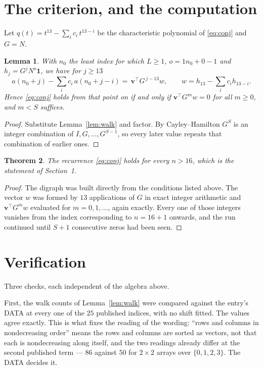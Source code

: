\documentclass[11pt,a4paper]{article}
\theoremstyle{plain}
\newtheorem{theorem}{Theorem}
\newtheorem{lemma}[theorem]{Lemma}
\theoremstyle{definition}
\begin{document}
\section{The criterion, and the computation}

Let $q(t)=t^{13}-\sum_i c_i\,t^{13-i}$ be the characteristic polynomial of
\eqref{eq:conj} and $G=N$.

\begin{lemma}\label{lem:crit}
With $n_0$ the least index for which $L\ge1$, $o=1n_0+0-1$ and
$h_j=G^{j}N^{o}\mathbf{1}$, we have for $j\ge13$
\[
a(n_0+j)-\sum_i c_i\,a(n_0+j-i)=\,\mathbf{v}^{\!\top}G^{\,j-13}w,
\qquad w=h_{13}-\sum_i c_ih_{13-i} .
\]
Hence \eqref{eq:conj} holds from that point on if and only if
$\mathbf{v}^{\!\top}G^{m}w=0$ for all $m\ge0$, and $m<S$ suffices.
\end{lemma}

\begin{proof}
Substitute Lemma~\ref{lem:walk} and factor. By Cayley--Hamilton $G^{S}$ is an integer
combination of $I,G,\dots,G^{S-1}$, so every later value repeats that combination of
earlier ones.
\end{proof}

\begin{theorem}
The recurrence \eqref{eq:conj} holds for every $n>16$, which is the statement of
Section~1.
\end{theorem}

\begin{proof}
The digraph was built directly from the conditions listed above. The vector $w$ was formed by
$13$ applications of $G$ in exact integer arithmetic and $\mathbf{v}^{\!\top}G^{m}w$
evaluated for $m=0,1,\dots$, again exactly. Every one of those integers vanishes from the
index corresponding to $n=16+1$ onwards, and the run continued until $S+1$ consecutive
zeros had been seen.
\end{proof}

\section{Verification}

Three checks, each independent of the algebra above.

First, the walk counts of Lemma~\ref{lem:walk} were compared against the entry's DATA at
every one of the $25$ published indices, with no shift fitted. The values agree exactly.
This is what fixes the reading of the wording: ``rows and columns in nondecreasing order''
means the rows and columns are sorted as vectors, not that each is nondecreasing along
itself, and the two readings already differ at the second published term --- $86$ against
$50$ for $2\times2$ arrays over $\{0,1,2,3\}$. The DATA decides it.
\end{document}
